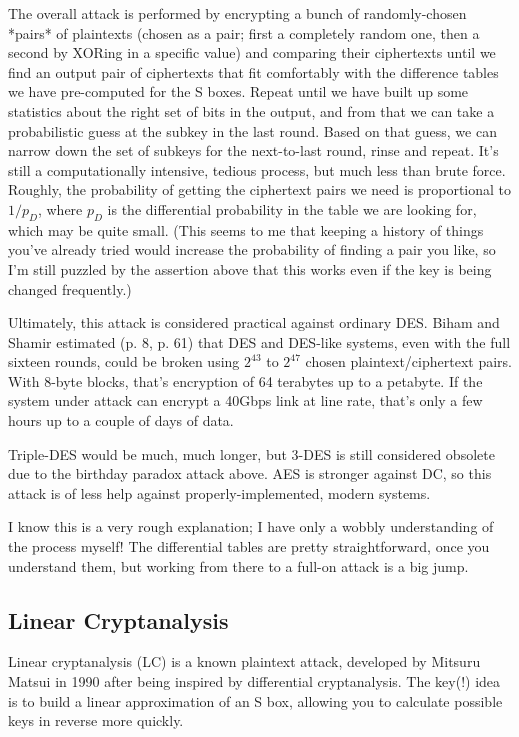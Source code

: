 \documentclass[%
 aip,
 jmp,%
 amsmath,amssymb,
 reprint,%
]{revtex4-1}
\begin{document}
The overall attack is performed by encrypting a bunch of
randomly-chosen *pairs* of plaintexts (chosen as a pair; first a
completely random one, then a second by XORing in a specific value)
and comparing their ciphertexts until we find an output pair of
ciphertexts that fit comfortably with the difference tables we have
pre-computed for the S boxes.  Repeat until we have built up some
statistics about the right set of bits in the output, and from that we
can take a probabilistic guess at the subkey in the last round.  Based
on that guess, we can narrow down the set of subkeys for the
next-to-last round, rinse and repeat.  It's still a computationally
intensive, tedious process, but much less than brute force.  Roughly,
the probability of getting the ciphertext pairs we need is
proportional to $1/p_D$, where $p_D$ is the differential probability in
the table we are looking for, which may be quite small.
(This seems to me that keeping a history of things you've already
tried would increase the probability of finding a pair you like, so
I'm still puzzled by the assertion above that this works even if the
key is being changed frequently.)

Ultimately, this attack is considered practical against ordinary DES.
Biham and Shamir estimated (p. 8, p. 61) that DES and DES-like
systems, even with the full sixteen rounds, could be broken using
$2^{43}$ to $2^{47}$ chosen plaintext/ciphertext pairs.  With 8-byte
blocks, that's encryption of 64 terabytes up to a petabyte.  If the
system under attack can encrypt a 40Gbps link at line rate, that's
only a few hours up to a couple of days of data.

Triple-DES would be much, much longer, but 3-DES is still considered
obsolete due to the birthday paradox attack above.  AES is stronger
against DC, so this attack is of less help against
properly-implemented, modern systems.

I know this is a very rough explanation; I have only a wobbly
understanding of the process myself!  The differential tables are
pretty straightforward, once you understand them, but working from
there to a full-on attack is a big jump.

\subsection{Linear Cryptanalysis}

Linear cryptanalysis (LC) is a known plaintext attack, developed by
Mitsuru Matsui in 1990 after being inspired by differential
cryptanalysis.  The key(!)  idea is to build a linear approximation of
an S box, allowing you to calculate possible keys in reverse more
quickly.
\end{document}
